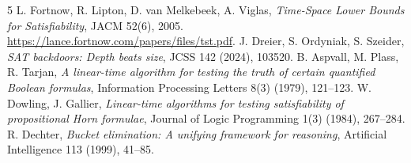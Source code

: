 \documentclass[11pt]{article}
\begin{document}
\begin{thebibliography}{5}
 L. Fortnow, R. Lipton, D. van Melkebeek, A. Viglas,
\emph{Time-Space Lower Bounds for Satisfiability}, JACM 52(6), 2005.
\url{https://lance.fortnow.com/papers/files/tst.pdf}.
 J. Dreier, S. Ordyniak, S. Szeider,
\emph{SAT backdoors: Depth beats size}, JCSS 142 (2024), 103520.
 B. Aspvall, M. Plass, R. Tarjan,
\emph{A linear-time algorithm for testing the truth of certain quantified Boolean formulas},
Information Processing Letters 8(3) (1979), 121--123.
 W. Dowling, J. Gallier,
\emph{Linear-time algorithms for testing satisfiability of propositional Horn formulae},
Journal of Logic Programming 1(3) (1984), 267--284.
 R. Dechter,
\emph{Bucket elimination: A unifying framework for reasoning},
Artificial Intelligence 113 (1999), 41--85.
\end{thebibliography}
\end{document}
